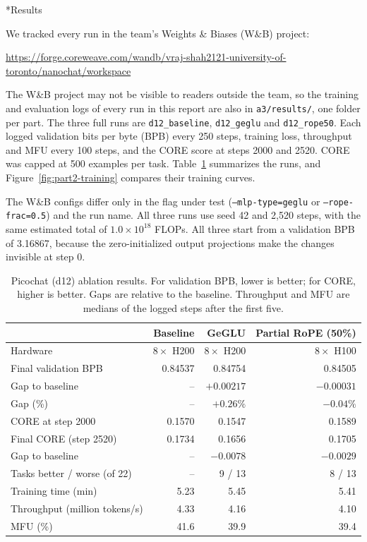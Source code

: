 \documentclass[11pt]{article}
\makeatletter
\renewcommand\subsection{\@startsection{subsection}{2}{\z@}{0.6em}{0.2em}{\normalsize\bfseries}}
\newcommand{\code}[1]{\texttt{#1}}
\makeatother
\begin{document}
\subsection*{Results}

We tracked every run in the team's Weights \& Biases (W\&B) project:
\begin{center}
\small\url{https://forge.coreweave.com/wandb/vraj-shah2121-university-of-toronto/nanochat/workspace}
\end{center}
The W\&B project may not be visible to readers outside the team, so the training and evaluation logs of every run in this report are also in \code{a3/results/}, one folder per part. The three full runs are \code{d12\_baseline}, \code{d12\_geglu} and \code{d12\_rope50}. Each logged validation bits per byte (BPB) every 250 steps, training loss, throughput and MFU every 100 steps, and the CORE score at steps 2000 and 2520. CORE was capped at 500 examples per task. Table~\ref{tab:part2-results} summarizes the runs, and Figure~\ref{fig:part2-training} compares their training curves.

The W\&B configs differ only in the flag under test (\code{--mlp-type=geglu} or \code{--rope-frac=0.5}) and the run name. All three runs use seed 42 and 2,520 steps, with the same estimated total of $1.0 \times 10^{18}$ FLOPs. All three start from a validation BPB of 3.16867, because the zero-initialized output projections make the changes invisible at step 0.

\begin{table}[H]
\centering
\caption{Picochat (d12) ablation results. For validation BPB, lower is better; for CORE, higher is better. Gaps are relative to the baseline. Throughput and MFU are medians of the logged steps after the first five.}
\label{tab:part2-results}
\begin{tabular}{@{}lrrr@{}}
\toprule
 & Baseline & GeGLU & Partial RoPE (50\%) \\
\midrule
Hardware & $8 \times$ H200 & $8 \times$ H200 & $8 \times$ H100 \\
Final validation BPB & 0.84537 & 0.84754 & 0.84505 \\
\quad Gap to baseline & -- & $+0.00217$ & $-0.00031$ \\
\quad Gap (\%) & -- & $+0.26\%$ & $-0.04\%$ \\
CORE at step 2000 & 0.1570 & 0.1547 & 0.1589 \\
Final CORE (step 2520) & 0.1734 & 0.1656 & 0.1705 \\
\quad Gap to baseline & -- & $-0.0078$ & $-0.0029$ \\
\quad Tasks better / worse (of 22) & -- & 9 / 13 & 8 / 13 \\
Training time (min) & 5.23 & 5.45 & 5.41 \\
Throughput (million tokens/s) & 4.33 & 4.16 & 4.10 \\
MFU (\%) & 41.6 & 39.9 & 39.4 \\
\bottomrule
\end{tabular}
\end{table}
\end{document}
